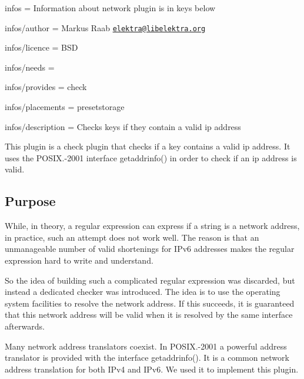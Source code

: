 
\begin{DoxyItemize}
\item infos = Information about network plugin is in keys below
\item infos/author = Markus Raab \href{mailto:elektra@libelektra.org}{\tt elektra@libelektra.\+org}
\item infos/licence = B\+S\+D
\item infos/needs =
\item infos/provides = check
\item infos/placements = presetstorage
\item infos/description = Checks keys if they contain a valid ip address
\end{DoxyItemize}

This plugin is a check plugin that checks if a key contains a valid ip address. It uses the {\ttfamily P\+O\+S\+I\+X.-\/2001} interface {\ttfamily getaddrinfo()} in order to check if an ip address is valid.

\subsection*{Purpose}

While, in theory, a regular expression can express if a string is a network address, in practice, such an attempt does not work well. The reason is that an unmanageable number of valid shortenings for I\+Pv6 addresses makes the regular expression hard to write and understand.

So the idea of building such a complicated regular expression was discarded, but instead a dedicated checker was introduced. The idea is to use the operating system facilities to resolve the network address. If this succeeds, it is guaranteed that this network address will be valid when it is resolved by the same interface afterwards.

Many network address translators coexist. In {\ttfamily P\+O\+S\+I\+X.-\/2001} a powerful address translator is provided with the interface {\ttfamily getaddrinfo()}. It is a common network address translation for both I\+Pv4 and I\+Pv6. We used it to implement this plugin. 